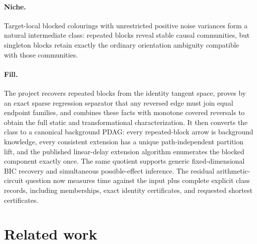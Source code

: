 \documentclass{article}
\begin{document}
\paragraph{Niche.} Target-local blocked colourings with unrestricted positive noise variances form a natural intermediate class: repeated blocks reveal stable causal communities, but singleton blocks retain exactly the ordinary orientation ambiguity compatible with those communities.

\paragraph{Fill.} The project recovers repeated blocks from the identity tangent space, proves by an exact sparse regression separator that any reversed edge must join equal endpoint families, and combines these facts with monotone covered reversals to obtain the full static and transformational characterization. It then converts the class to a canonical background PDAG: every repeated-block arrow is background knowledge, every consistent extension has a unique path-independent partition lift, and the published linear-delay extension algorithm enumerates the blocked component exactly once. The same quotient supports generic fixed-dimensional BIC recovery and simultaneous possible-effect inference. The residual arithmetic-circuit question now measures time against the input plus complete explicit class records, including memberships, exact identity certificates, and requested shortest certificates.

\section{Related work}
\end{document}
